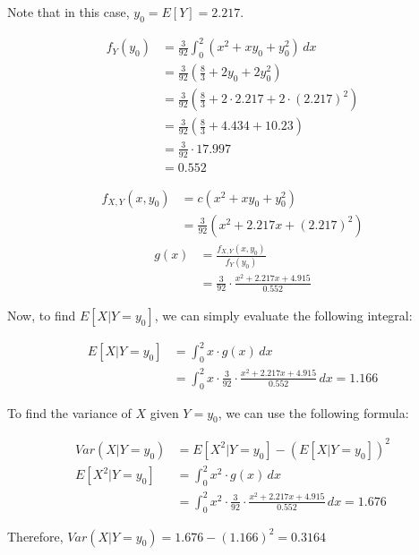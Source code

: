 \documentclass[a4paper]{article}
\begin{document}
\begin{enumerate}[label=(\alph*)]
    Note that in this case, $y_0 = E[Y] = 2.217$.

    \begin{align*}
        f_Y(y_0) &= \frac{3}{92} \int_{0}^{2} (x^2 + xy_0 + y_0^2) \, dx \\
        &= \frac{3}{92} \left( \frac{8}{3} + 2y_0 + 2y_0^2 \right) \\
        &= \frac{3}{92} \left( \frac{8}{3} + 2 \cdot 2.217 + 2 \cdot (2.217)^2 \right) \\
        &= \frac{3}{92} \left( \frac{8}{3} + 4.434 + 10.23 \right) \\
        &= \frac{3}{92} \cdot 17.997 \\
        &= 0.552
    \end{align*}

    \begin{align*}
        f_{X,Y}(x, y_0) &= c(x^2 + xy_0 + y_0^2) \\
        &= \frac{3}{92} (x^2 + 2.217x + (2.217)^2)
    \end{align*}
    \begin{align*}
        g(x) &= \frac{f_{X,Y}(x, y_0)}{f_Y(y_0)} \\
        &= \frac{3}{92} \cdot \frac{x^2 + 2.217x + 4.915}{0.552}
    \end{align*}

    Now, to find $E[X|Y = y_0]$, we can simply evaluate the following integral:

    \begin{align*}
        E[X|Y = y_0] &= \int_{0}^{2} x \cdot g(x) \, dx \\
        &= \int_{0}^{2} x \cdot \frac{3}{92} \cdot \frac{x^2 + 2.217x + 4.915}{0.552} \, dx = 1.166
    \end{align*}

    To find the variance of $X$ given $Y = y_0$, we can use the following formula:

    \begin{align*}
        Var(X|Y = y_0) &= E[X^2|Y = y_0] - (E[X|Y = y_0])^2 \\
        E[X^2|Y = y_0] &= \int_{0}^{2} x^2 \cdot g(x) \, dx \\
        &= \int_{0}^{2} x^2 \cdot \frac{3}{92} \cdot \frac{x^2 + 2.217x + 4.915}{0.552} \, dx = 1.676
    \end{align*}

    Therefore, $Var(X|Y = y_0) = 1.676 - (1.166)^2 = 0.3164$
\end{enumerate}
\end{document}
